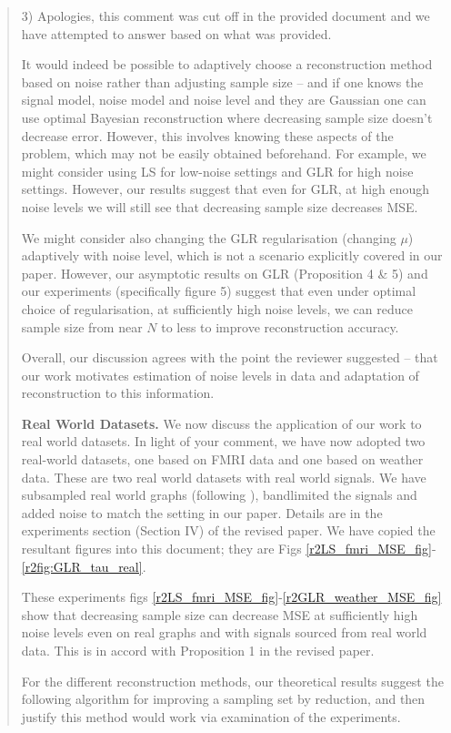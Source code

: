 \documentclass[11pt,onecolumn,journal]{IEEEtran}
\theoremstyle{definition}
\begin{document}
\begin{quote}
3) Apologies, this comment was cut off in the provided document and we have  attempted to answer based on what was provided.

It would indeed be possible to adaptively choose a reconstruction method based on noise rather than adjusting sample size -- and if one knows the signal model, noise model and noise level and they are Gaussian one can use optimal Bayesian reconstruction where decreasing sample size doesn't decrease error.
However, this involves knowing these aspects of the problem, which may not be easily obtained beforehand. 
For example, we might consider using LS for low-noise settings and GLR for high noise settings. However, our results suggest that even for GLR, at high enough noise levels we will still see that decreasing sample size decreases MSE.

We might consider also changing the GLR regularisation (changing $\mu$) adaptively with noise level, which is not a scenario explicitly covered in our paper. However, our asymptotic results on GLR (Proposition 4 \& 5) and our experiments (specifically figure 5) suggest that even under optimal choice of regularisation, at sufficiently high noise levels, we can reduce sample size from near $N$ to less to improve reconstruction accuracy.

Overall, our discussion agrees with the point the reviewer suggested -- that our work motivates estimation of noise levels in data and adaptation of reconstruction to this information.

\textbf{Real World Datasets.}
We now discuss the application of our work to real world datasets. In light of your comment, we have now adopted two real-world datasets, one based on FMRI data and one based on weather data. These are two real world datasets with real world signals. We have subsampled real world graphs (following \cite{zhi2023gaussian}), bandlimited the signals and added noise to match the setting in our paper. Details are in the experiments section (Section IV) of the revised paper. We have copied the resultant figures into this document; they are Figs \ref{r2LS_fmri_MSE_fig}-\ref{r2fig:GLR_tau_real}.

These experiments figs \ref{r2LS_fmri_MSE_fig}-\ref{r2GLR_weather_MSE_fig} show that decreasing sample size can decrease MSE at sufficiently high noise levels even on real graphs and with signals sourced from real world data. This is in accord with Proposition 1 in the revised paper.

For the different reconstruction methods, our theoretical results suggest the following algorithm for improving a sampling set by reduction, and then justify this method would work via examination of the experiments.


\end{quote}
\end{document}
